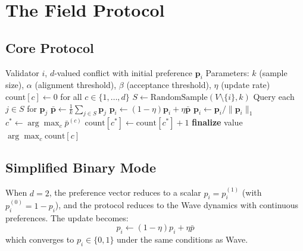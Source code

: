 \section{The Field Protocol}

\label{sec:field-protocol}

\subsection{Core Protocol}

\begin{algorithm}[H]
\caption{Field Protocol --- Multi-Valued Consensus}
\label{alg:field-field-core}
\begin{algorithmic}[1]
\Require Validator $i$, $d$-valued conflict with initial preference $\mathbf{p}_i$
\Require Parameters: $k$ (sample size), $\alpha$ (alignment threshold), $\beta$ (acceptance threshold), $\eta$ (update rate)
\State $\text{count}[c] \gets 0$ for all $c \in \{1, \ldots, d\}$
    \State $S \gets \text{RandomSample}(V \setminus \{i\}, k)$
    \State Query each $j \in S$ for $\mathbf{p}_j$
    \State $\bar{\mathbf{p}} \gets \frac{1}{k} \sum_{j \in S} \mathbf{p}_j$ 
    \State {}
    \State $\mathbf{p}_i \gets (1 - \eta) \mathbf{p}_i + \eta \bar{\mathbf{p}}$ 
    \State $\mathbf{p}_i \gets \mathbf{p}_i / \|\mathbf{p}_i\|_1$ 
    \State $c^* \gets \arg\max_c \bar{p}^{(c)}$ 
     
        \State $\text{count}[c^*] \gets \text{count}[c^*] + 1$
    \EndIf
        \State \textbf{finalize} value $\arg\max_c \text{count}[c]$
    \EndIf
\EndWhile
\end{algorithmic}
\end{algorithm}

\subsection{Simplified Binary Mode}

When $d = 2$, the preference vector reduces to a scalar $p_i = p_i^{(1)}$ (with
$p_i^{(0)} = 1 - p_i$), and the protocol reduces to the Wave dynamics with continuous
preferences. The update becomes:
\[
p_i \gets (1 - \eta) p_i + \eta \bar{p}
\]
which converges to $p_i \in \{0, 1\}$ under the same conditions as Wave.

